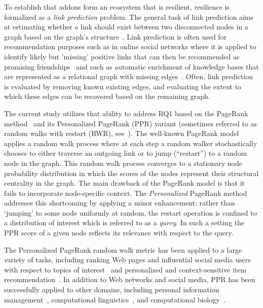 \documentclass[10pt,letterpaper]{article}
\begin{document}
To establish that addons form an ecosystem that is resilient, resilience is formalized as a \textit{link prediction} problem. The general task of link prediction aims at estimating whether a link should exist between two disconnected nodes in a graph based on the graph's structure~\cite{henzinger2000link,getoor2005link,lu2011link,sunWSDM12}. Link prediction is often used for recommendation purposes such as in online social networks where it is applied to identify likely but 'missing' positive links that can then be recommended as promising friendships~\cite{leskovec2010predicting} and such as automatic enrichment of knowledge bases that are represented as a relational graph with missing edges~\cite{lao2010relational}. Often, link prediction is evaluated by removing known existing edges, and evaluating the extent to which these edges can be recovered based on the remaining graph. 

The current study utilizes that ability to address RQ1 based on the PageRank method~\cite{page1999pagerank,franceschet2011pagerank} and its Personalized PageRank (PPR) variant (sometimes referred to as random walks with restart (RWR), see~\cite{tongKAIS08}). The well-known PageRank model applies a random walk process where at each step a random walker stochastically chooses to either traverse an outgoing link or to jump (``restart'') to a random node in the graph. This random walk process converges to a stationary node probability distribution in which the scores of the nodes represent their structural centrality in the graph. The main drawback of the PageRank model is that it fails to incorporate node-specific context. The \textit{Personalized} PageRank method addresses this shortcoming by applying a minor enhancement: rather than `jumping' to some node uniformly at random, the restart operation is confined to a distribution of interest which is referred to as a \textit{query}. In such a setting the PPR score of a given node reflects its relevance with respect to the query.

The Personalized PageRank random walk metric has been applied to a large variety of tasks, including ranking Web pages and influential social media users with respect to topics of interest~\cite{haveliwala2002topic,weng2010twitterrank} and personalized and context-sensitive item recommendation~\cite{lee2011random}. In addition to Web networks and social media, PPR has been successfully applied to other domains, including personal information management~\cite{minkov2010improving}, computational linguistics~\cite{agirreEACL09}, and computational biology~\cite{freschi2007protein}.
\end{document}
